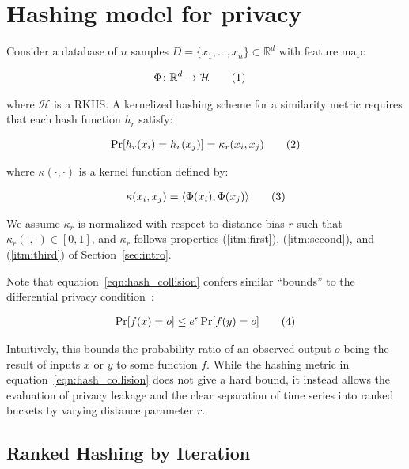 \documentclass[a4paper]{article}
\newcommand\numberthis{\addtocounter{equation}{1}\tag{\theequation}}
\newcommand{\innerproduct}[2]{\langle{}#1,#2\rangle{}}
\begin{document}
\section{Hashing model for privacy}

Consider a database of $n$ samples $D = \{x_1,\ldots,x_n\} \subset \mathbb{R}^d$ with feature map:

\begin{align*}
    \Phi \colon \mathbb{R}^d &\to \mathcal{H} \numberthis
\end{align*}

where $\mathcal{H}$ is a RKHS\@.
A kernelized hashing scheme for a similarity metric requires that each hash function $h_r$ satisfy:

\begin{align*}
    \Pr[h_r(x_i) = h_r(x_j)] = \kappa_r(x_i, x_j) \numberthis
    \label{eqn:hash_collision}
\end{align*}

where $\kappa(\cdot,\cdot)$ is a kernel function defined by:

\begin{align*}
    \kappa(x_i,x_j) = \innerproduct{\Phi(x_i)}{\Phi(x_j)} \numberthis
\end{align*}

We assume $\kappa_r$ is normalized with respect to distance bias $r$ such that $\kappa_r(\cdot,\cdot) \in [0,1]$, and $\kappa_r$ follows properties (\ref{itm:first}), (\ref{itm:second}), and (\ref{itm:third}) of Section~\ref{sec:intro}.

Note that equation~\ref{eqn:hash_collision} confers similar ``bounds'' to the differential privacy condition~\cite{dwork2006}:

\begin{align*}
    \Pr[f(x) = o] \le e^{\epsilon} \Pr[f(y) = o] \numberthis
    \label{eqn:differential_privacy}
\end{align*}

Intuitively, this bounds the probability ratio of an observed output $o$ being the result of inputs $x$ or $y$ to some function $f$.
While the hashing metric in equation~\ref{eqn:hash_collision} does not give a hard bound, it instead allows the evaluation of privacy leakage and the clear separation of time series into ranked buckets by varying distance parameter $r$.

\subsection{Ranked Hashing by Iteration}
\label{subsec:ranked_lsh}
\end{document}
